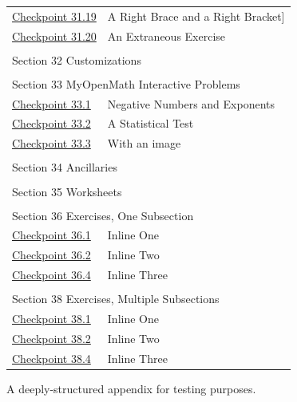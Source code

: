 \documentclass{amsart}
\theoremstyle{plain}%
\theoremstyle{definition}%
\theoremstyle{remark}%
\numberwithin{equation}{section}
\begin{document}
\begin{appendices}
\begin{longtable}[l]{ll}
\hyperref[exercise-difficult-title]{Checkpoint 31.19}& A Right Brace \textbraceright{} and a Right Bracket]\\
\hyperref[section-advanced-numbering-12-2]{Checkpoint 31.20}& An Extraneous Exercise\\
\multicolumn{2}{l}{\null}\\[1.5ex] \multicolumn{2}{l}{\large Section 32 Customizations}\\[0.5ex]
\multicolumn{2}{l}{\null}\\[1.5ex] \multicolumn{2}{l}{\large Section 33 MyOpenMath Interactive Problems}\\[0.5ex]
\hyperref[section-myopenmath-3]{Checkpoint 33.1}& Negative Numbers and Exponents\\
\hyperref[section-myopenmath-4]{Checkpoint 33.2}& A Statistical Test\\
\hyperref[section-myopenmath-5]{Checkpoint 33.3}& With an image\\
\multicolumn{2}{l}{\null}\\[1.5ex] \multicolumn{2}{l}{\large Section 34 Ancillaries}\\[0.5ex]
\multicolumn{2}{l}{\null}\\[1.5ex] \multicolumn{2}{l}{\large Section 35 Worksheets}\\[0.5ex]
\multicolumn{2}{l}{\null}\\[1.5ex] \multicolumn{2}{l}{\large Section 36 Exercises, One Subsection}\\[0.5ex]
\hyperref[section-exercises-single-5]{Checkpoint 36.1}& Inline One\\
\hyperref[duplicate-inline]{Checkpoint 36.2}& Inline Two\\
\hyperref[section-exercises-single-9]{Checkpoint 36.4}& Inline Three\\
\multicolumn{2}{l}{\null}\\[1.5ex] \multicolumn{2}{l}{\large Section 38 Exercises, Multiple Subsections}\\[0.5ex]
\hyperref[section-exercises-multiple-3-2]{Checkpoint 38.1}& Inline One\\
\hyperref[section-exercises-multiple-3-4]{Checkpoint 38.2}& Inline Two\\
\hyperref[exercise-duplicate-inline]{Checkpoint 38.4}& Inline Three\\
\end{longtable}
%
%
\typeout{************************************************}
\typeout{************************************************}
%
\label{appendix-structured}%
A deeply-structured appendix for testing purposes.%
%
%
\typeout{************************************************}
\typeout{************************************************}
%

\end{appendices}
\end{document}

